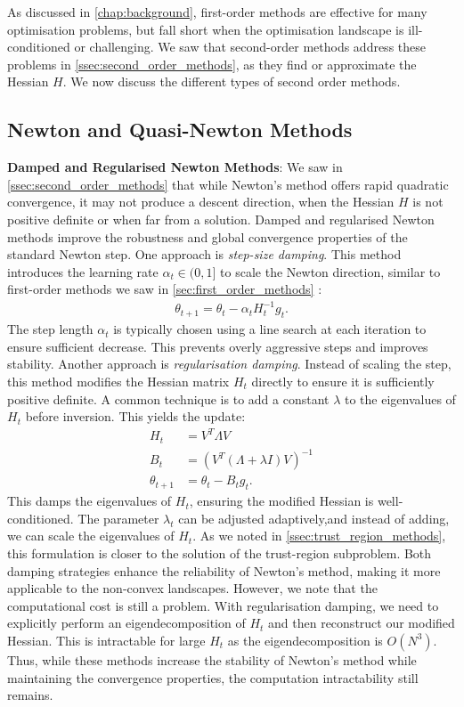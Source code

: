 As discussed in \cref{chap:background}, first-order methods are effective for many optimisation problems, but fall short when the optimisation landscape is ill-conditioned or challenging. We saw that second-order methods address these problems in \cref{ssec:second_order_methods}, as they find or approximate the Hessian $H$. We now discuss the different types of second order methods. 

\subsection{Newton and Quasi-Newton Methods} 
\label{sec:newton_methods}

\textbf{Damped and Regularised Newton Methods}:
We saw in \cref{ssec:second_order_methods} that while Newton's method offers rapid quadratic convergence, it may not produce a descent direction, when the Hessian $H$ is not positive definite or when far from a solution. Damped and regularised Newton methods improve the robustness and global convergence properties of the standard Newton step. One approach is \textit{step-size damping}. This method introduces the learning rate $\alpha_t \in (0, 1]$ to scale the Newton direction, similar to first-order methods we saw in \cref{sec:first_order_methods} \citep{sun2019survey}:
\begin{align}
    \theta_{t+1} = \theta_t - \alpha_t H_t^{-1} g_t.
\end{align}
The step length $\alpha_t$ is typically chosen using a line search at each iteration to ensure sufficient decrease. This prevents overly aggressive steps and improves stability. Another approach is \textit{regularisation damping}. Instead of scaling the step, this method modifies the Hessian matrix $H_t$ directly to ensure it is sufficiently positive definite. A common technique is to add a constant $\lambda$ to the eigenvalues of $H_t$ before inversion. This yields the update:
\begin{align}
    H_t &= V^T \Lambda V \\
    B_t &= (V^T (\Lambda + \lambda I) V)^{-1} \\
    \theta_{t+1} &= \theta_t - B_t g_t.
\end{align}
This damps the eigenvalues of $H_t$, ensuring the modified Hessian is well-conditioned. The parameter $\lambda_t$ can be adjusted adaptively,and instead of adding, we can scale the eigenvalues of $H_t$. As we noted in \cref{ssec:trust_region_methods}, this formulation is closer to the solution of the trust-region subproblem. Both damping strategies enhance the reliability of Newton's method, making it more applicable to the non-convex landscapes. However, we note that the computational cost is still a problem. With regularisation damping, we need to explicitly perform an eigendecomposition of $H_t$ and then reconstruct our modified Hessian. This is intractable for large $H_t$ as the eigendecomposition is $O(N^3)$. Thus, while these methods increase the stability of Newton's method while maintaining the convergence properties, the computation intractability still remains.


